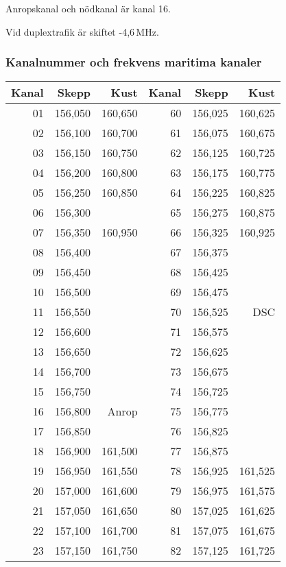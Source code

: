Anropskanal och nödkanal är kanal 16.

Vid duplextrafik är skiftet -4,6\,MHz.
\clearpage
\subsubsection{Kanalnummer och frekvens maritima kanaler}

\begin{longtable}{rrr|rrr}
	\textbf{Kanal} & \textbf{Skepp} & \textbf{Kust} & \textbf{Kanal} & \textbf{Skepp} & \textbf{Kust} \\ \hline
	   \endhead
01 & 156,050 & 160,650 & 60 & 156,025 & 160,625 \\
02 & 156,100 & 160,700 & 61 & 156,075 & 160,675 \\
03 & 156,150 & 160,750 & 62 & 156,125 & 160,725 \\
04 & 156,200 & 160,800 & 63 & 156,175 & 160,775 \\
05 & 156,250 & 160,850 & 64 & 156,225 & 160,825 \\
06 & 156,300 &         & 65 & 156,275 & 160,875 \\
07 & 156,350 & 160,950 & 66 & 156,325 & 160,925 \\
08 & 156,400 &         & 67 & 156,375 & \\
09 & 156,450 &         & 68 & 156,425 & \\
10 & 156,500 &         & 69 & 156,475 & \\
11 & 156,550 &         & 70 & 156,525 & DSC \\
12 & 156,600 &         & 71 & 156,575 & \\
13 & 156,650 &         & 72 & 156,625 & \\
14 & 156,700 &         & 73 & 156,675 & \\
15 & 156,750 &         & 74 & 156,725 & \\
16 & 156,800 & Anrop   & 75 & 156,775 & \\
17 & 156,850 &         & 76 & 156,825 & \\
18 & 156,900 & 161,500 & 77 & 156,875 & \\
19 & 156,950 & 161,550 & 78 & 156,925 & 161,525 \\
20 & 157,000 & 161,600 & 79 & 156,975 & 161,575 \\
21 & 157,050 & 161,650 & 80 & 157,025 & 161,625 \\
22 & 157,100 & 161,700 & 81 & 157,075 & 161,675 \\
23 & 157,150 & 161,750 & 82 & 157,125 & 161,725 \\

\end{longtable}
